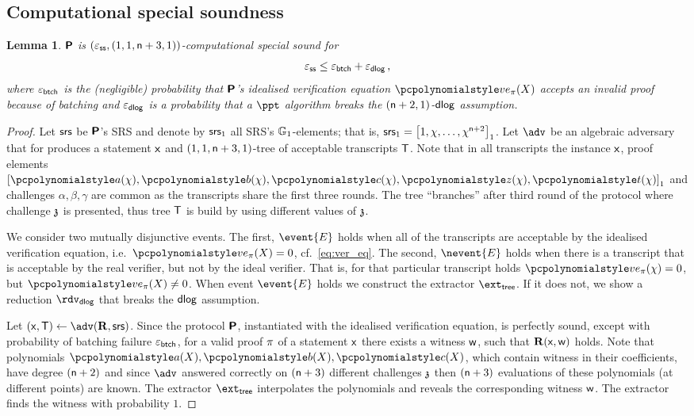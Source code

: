 \documentclass[runningheads,11pt]{llncs}
\newtheorem{lemma}[theorem]{Lemma} \newtheorem{corollary}[theorem]{Corollary}
\theoremstyle{definition} \newtheorem{definition}[theorem]{Definition}
\begin{document}
\subsection{Computational special soundness}
\begin{lemma}
\label{lem:plonkprot_ss}
$\bm{\mathsf{P}}$ is $(\varepsilon_{\mathsf{ss}}, (1, 1, \mathsf{n} + 3, 1))$-computational special sound
for 
 \[
	\varepsilon_{\mathsf{ss}} \leq \varepsilon_{\mathsf{btch}} + \varepsilon_{\mathsf{dlog}}\,,
 \] 
 where $\varepsilon_{\mathsf{btch}}$ is the (negligible) probability that $\bm{\mathsf{P}}$'s idealised
 verification equation $\vereq_\zkproof(X)$ accepts an invalid proof because of batching
 and $\varepsilon_{\mathsf{dlog}}$ is a probability that a $\ppt$ algorithm breaks the
 $(\mathsf{n} + 2, 1)$-$\mathsf{dlog}$ assumption.
\end{lemma}
\begin{proof}
  Let $\mathsf{srs}$ be $\bm{\mathsf{P}}$'s SRS and denote by $\mathsf{srs}_1$ all SRS's
  $\mathbb{G}_1$-elements; that is,
  $\mathsf{srs}_1 = \left[1, \chi, \ldots, \chi^{\mathsf{n} + 2}\right]_{1}$. Let $\adv$ be an
  algebraic adversary that for produces a statement $\mathsf{x}$ and
  $(1, 1, \mathsf{n} + 3, 1)$-tree of acceptable transcripts $\mathsf{T}$.  Note that in
  all transcripts the instance $\mathsf{x}$, proof elements
  $\gone{\p{a}(\chi), \p{b}(\chi), \p{c}(\chi), \p{z}(\chi), \p{t}(\chi)}$ and
  challenges $\alpha, \beta, \gamma$ are common as the transcripts share the
  first three rounds. The tree ``branches'' after third round of the protocol
  where challenge $\mathfrak{z}$ is presented, thus tree $\mathsf{T}$ is build by using different
  values of $\mathfrak{z}$. 

  We consider two mutually disjunctive events. The first, $\event{E}$ holds when
  all of the transcripts are acceptable by the idealised verification equation,
  i.e.~$\vereq_\zkproof(X) = 0$, cf.~\cref{eq:ver_eq}. The second, $\nevent{E}$ holds
  when there is a transcript that is acceptable by the real verifier, but not by
  the ideal verifier. That is, for that particular transcript holds
  $\vereq_\zkproof(\chi) = 0$, but $\vereq_\zkproof(X) \neq 0$.  When event $\event{E}$ holds we
  construct the extractor $\extt$. If it does not, we show a reduction
  $\rdvdlog$ that breaks the $\mathsf{dlog}$ assumption.

   Let $(\inp, \tree) \gets \adv(\REL,
  \srs)$. Since the protocol $\bm{\mathsf{P}}$, instantiated with the idealised
  verification equation, is perfectly sound, except with probability of batching
  failure $\varepsilon_{\mathsf{btch}}$, for a valid proof $\pi$ of a statement $\mathsf{x}$ there
  exists a witness $\mathsf{w}$, such that $\mathbf{R}(\mathsf{x}, \mathsf{w})$ holds. Note that 
  polynomials $\p{a}(X), \p{b}(X), \p{c}(X)$, which contain witness in their
  coefficients, have degree $(\mathsf{n} + 2)$ and since $\adv$ answered correctly
  on $(\mathsf{n} + 3)$ different challenges $\mathfrak{z}$ then $(\mathsf{n} + 3)$ evaluations
  of these polynomials (at different points) are known. The extractor $\extt$
  interpolates the polynomials and reveals the corresponding witness
  $\mathsf{w}$. The extractor finds the witness with probability $1$.


\end{proof}
\end{document}
